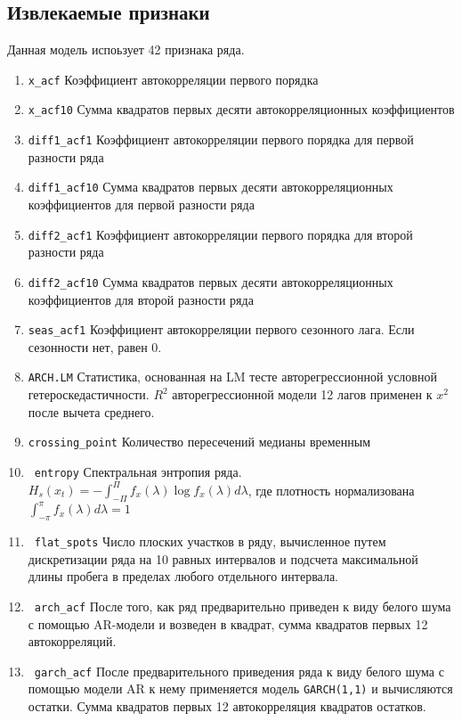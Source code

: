 \documentclass[a4paper,12pt]{article}
\theoremstyle{plain} %
\theoremstyle{definition} %
\theoremstyle{remark} %
\begin{document}
\subsection{Извлекаемые признаки}

  Данная модель испоьзует 42 признака ряда.


    \begin{enumerate}
      \item \verb|x_acf| Коэффициент автокорреляции первого порядка
      \item \verb|x_acf10| Сумма квадратов первых десяти автокорреляционных коэффициентов
      \item \verb|diff1_acf1| Коэффициент автокорреляции первого порядка для первой разности ряда
      \item \verb|diff1_acf10| Сумма квадратов первых десяти автокорреляционных коэффициентов для первой разности ряда
      \item \verb|diff2_acf1| Коэффициент автокорреляции первого порядка для второй разности ряда
      \item \verb|diff2_acf10| Сумма квадратов первых десяти автокорреляционных коэффициентов для второй разности ряда
      \item \verb|seas_acf1| Коэффициент автокорреляции первого сезонного лага. Если сезонности нет, равен 0.
      \item \verb|ARCH.LM| Статистика, основанная на LM тесте авторегрессионной условной гетероскедастичности. $R^2$ авторегрессионной модели 12 лагов применен к $x^2$ после вычета среднего.
      \item \verb|crossing_point| Количество пересечений медианы временным
      \item \verb|entropy|  Спектральная энтропия ряда. $H_s(x_t) = - \int_{-\Pi}^{\Pi} f_x(\lambda) \log f_x(\lambda) d\lambda$, где плотность нормализована $\int_{-\pi}^{\pi} f_x(\lambda) d\lambda = 1$
      \item \verb|flat_spots|  Число плоских участков в ряду, вычисленное путем дискретизации ряда на 10 равных интервалов и подсчета максимальной длины пробега в пределах любого отдельного интервала.
      \item \verb|arch_acf|  После того, как ряд предварительно приведен к виду белого шума с помощью AR-модели и возведен в квадрат, сумма квадратов первых 12 автокорреляций.
      \item \verb|garch_acf|  После предварительного приведения ряда к виду белого шума с помощью модели AR к нему применяется модель \verb|GARCH(1,1)| и вычисляются остатки. Сумма квадратов первых 12 автокорреляция квадратов остатков.

\end{enumerate}
\end{document}
